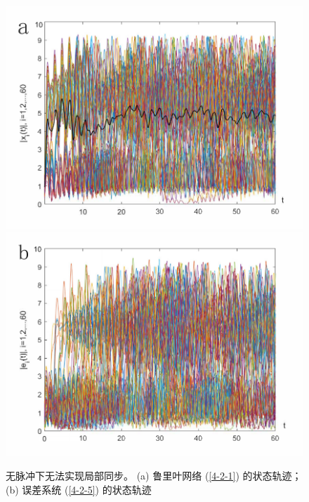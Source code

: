 \begin{figure}[H]
    \centering
    \includegraphics[scale=0.5]{./ch4/fig4-4-1.pdf}
    \includegraphics[scale=0.5]{./ch4/fig4-4-2.pdf}
    \caption{无脉冲下无法实现局部同步。 (a) 鲁里叶网络 (\ref{4-2-1}) 的状态轨迹；(b) 误差系统 (\ref{4-2-5}) 的状态轨迹 } 
    \label{f4-4} 
\end{figure}         
